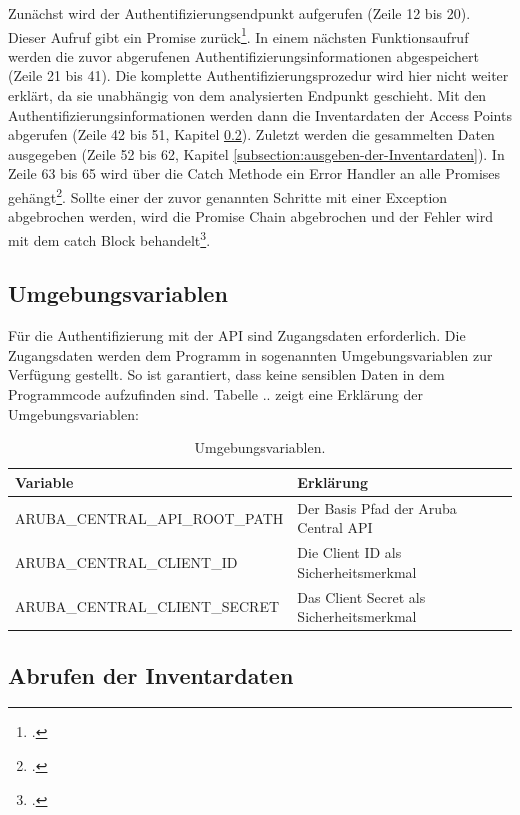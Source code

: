 Zunächst wird der Authentifizierungsendpunkt aufgerufen (Zeile 12 bis 20). Dieser Aufruf gibt ein Promise zurück\footcite{zabriskie_axios_2021}. In einem nächsten Funktionsaufruf werden die zuvor abgerufenen Authentifizierungsinformationen abgespeichert (Zeile 21 bis 41). Die komplette Authentifizierungsprozedur wird hier nicht weiter erklärt, da sie unabhängig von dem analysierten Endpunkt geschieht. Mit den Authentifizierungsinformationen werden dann die Inventardaten der Access Points abgerufen (Zeile 42 bis 51, Kapitel \ref{subsection:abrufen-der-Inventardaten}). Zuletzt werden die gesammelten Daten ausgegeben (Zeile 52 bis 62, Kapitel \ref{subsection:ausgeben-der-Inventardaten}). In Zeile 63 bis 65 wird über die Catch Methode ein Error Handler an alle Promises gehängt\footcite[S. 772]{ecma_international_ecmascript_2021}. Sollte einer der zuvor genannten Schritte mit einer Exception abgebrochen werden, wird die Promise Chain abgebrochen und der Fehler wird mit dem catch Block behandelt\footcite{mozilla_foundation_using_2021}.

\subsection{Umgebungsvariablen}\label{subsection:Umgebungsvariablen}

Für die Authentifizierung mit der API sind Zugangsdaten erforderlich. Die Zugangsdaten werden dem Programm in sogenannten Umgebungsvariablen zur Verfügung gestellt. So ist garantiert, dass keine sensiblen Daten in dem Programmcode aufzufinden sind. Tabelle .. zeigt eine Erklärung der Umgebungsvariablen:


\begin{table}[htb]
\centering
\begin{tabular}{l|l}
    \textbf{Variable} & \textbf{Erklärung} \\
    \hline
    ARUBA\_CENTRAL\_API\_ROOT\_PATH & Der Basis Pfad der Aruba Central API \\
    \hline
    ARUBA\_CENTRAL\_CLIENT\_ID & Die Client ID als Sicherheitsmerkmal \\
    \hline
    ARUBA\_CENTRAL\_CLIENT\_SECRET & Das Client Secret als Sicherheitsmerkmal \\
\end{tabular}
\caption{Umgebungsvariablen.}
\label{tab:Umgebungsvariablen}
\end{table}

\subsection{Abrufen der Inventardaten}\label{subsection:abrufen-der-Inventardaten}

